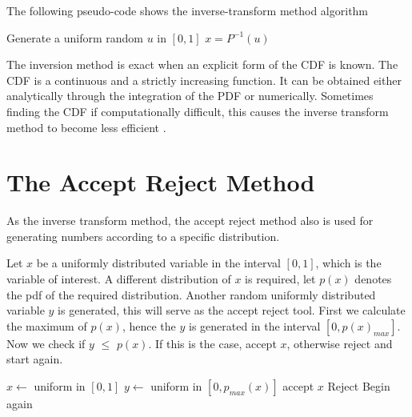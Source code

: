    
The following pseudo-code shows the inverse-transform method algorithm 
\begin{algorithmic}
\State Generate a uniform  random $u$ in $[0,1]$
\State \Return $x = P^{-1}(u)$
\end{algorithmic}

The inversion method is exact when an explicit form of the CDF is known. The CDF is a continuous and a strictly increasing function. It can be obtained either analytically through the integration of the PDF or numerically. Sometimes finding the CDF if computationally difficult, this causes the inverse transform method to become less efficient \citep{Devroye:1986:SNR:318242.318443}.

\section{The Accept Reject Method}
As the inverse transform method, the accept reject method also is used for generating numbers according to a specific distribution.

Let $x$ be a uniformly distributed variable in the interval $[0,1]$, which is the variable of interest. A different distribution of $x$ is required, let $p(x)$ denotes the pdf of the required distribution. Another  random uniformly distributed variable $y$ is generated, this will serve as the accept reject tool. First we calculate the maximum of $p(x)$, hence the $y$ is generated in the interval $[0,p(x)_{max}]$. Now we check if $y$ $\leq$ $p(x)$. If this is the case, accept $x$, otherwise reject and start again. 
\begin{algorithmic} 
\State $x \gets$ uniform in $[0, 1]$
\State $y \gets$ uniform in $[0, p_{max}(x)]$
    \State accept $x$
\Else 
	\State Reject 
\EndIf
\State Begin again
\end{algorithmic}
% 

